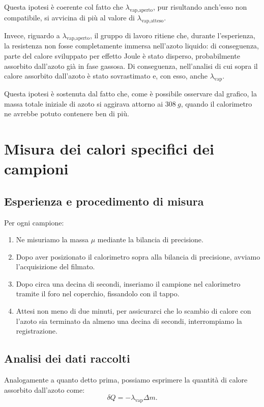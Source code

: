 \documentclass{article}
\begin{document}
Questa ipotesi è coerente col fatto che $\lambda_\text{vap,aperto}$,
pur risultando anch'esso non compatibile, si avvicina di più al valore
di $\lambda_\text{vap,atteso}$.

\vspace{2mm}
Invece, riguardo a $\lambda_\text{vap,aperto}$, il gruppo di
lavoro ritiene che, durante l'esperienza, la resistenza non fosse
completamente immersa nell'azoto liquido: di conseguenza, parte
del calore sviluppato per effetto Joule è stato disperso,
probabilmente assorbito dall'azoto già in fase gassosa.
Di conseguenza, nell'analisi di cui sopra il calore assorbito
dall'azoto è stato sovrastimato e, con esso, anche
$\lambda_\text{vap}$.

Questa ipotesi è sostenuta dal fatto che, come è possibile
osservare dal grafico, la massa totale iniziale di azoto si
aggirava attorno ai $\qty{308}{g}$, quando il calorimetro ne
avrebbe potuto contenere ben di più.

\section{Misura dei calori specifici dei campioni}

\subsection{Esperienza e procedimento di misura}

Per ogni campione:
\begin{enumerate}
  \item
    Ne misuriamo la massa $\mu$ mediante la bilancia di precisione.
  \item
    Dopo aver posizionato il calorimetro sopra alla bilancia di precisione,
    avviamo l'acquisizione del filmato.
  \item
    Dopo circa una decina di secondi, inseriamo il campione nel calorimetro
    tramite il foro nel coperchio, fissandolo con il tappo.
  \item
    Attesi non meno di due minuti, per assicurarci che lo scambio di calore con
    l'azoto sia terminato da almeno una decina di secondi, interrompiamo
    la registrazione.
\end{enumerate}

\subsection{Analisi dei dati raccolti}
Analogamente a quanto detto prima, possiamo esprimere la quantità di calore
assorbito dall'azoto come:
\[
  \delta Q = - \lambda_\text{vap} \Delta m.
\]
\end{document}
